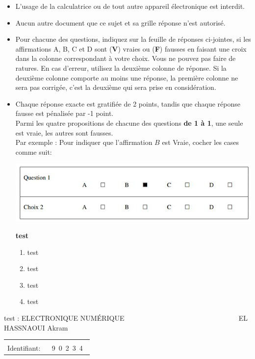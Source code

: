 \documentclass{book}%
\begin{document}
\begin{itemize}%
\item%
L'usage de la calculatrice ou de tout autre appareil électronique est interdit.%
\item%
Aucun autre document que ce sujet et sa grille réponse n'est autorisé.%
\item%
Pour chacune des questions, indiquez sur la feuille de réponses ci-jointes, si les affirmations A, B, C et D sont (\textbf{V}) vraies ou (\textbf{F}) fausses en faisant une croix dans la colonne correspondant à votre choix. Vous ne pouvez pas faire de ratures. En cas d'erreur, utilisez la deuxième colonne de réponse. Si la deuxième colonne comporte au moins une réponse, la première colonne ne sera pas corrigée, c'est la deuxième qui sera prise en considération.%
\item%
Chaque réponse exacte est gratifiée de 2 points, tandis que chaque réponse fausse est pénalisée par -1 point. \\ 	Parmi les quatre propositions de chacune des questions \textbf{de 1 à 1}, une seule est vraie, les autres sont fausses. \\ 	Par exemple : Pour indiquer que l'affirmation $B$ est Vraie, cocher les cases comme suit:  \\ \begin{center}	\includegraphics[scale=0.8]{reponses.png} \end{center}%
\thispagestyle{empty}%
\begin{exercise}%
\textbf{test }%
\begin{enumerate}[label=\textbf{\Alph*. }]%
\item%
test%
\item%
test%
\item%
test%
\item%
test%
\end{enumerate}%
\end{exercise}%
\end{itemize}%
\newpage%
\thispagestyle{empty}%
test : ELECTRONIQUE NUMÉRIQUE $\qquad \qquad \qquad \qquad \qquad \qquad \qquad \qquad$ EL HASSNAOUI Akram%
\begin{flushright}%
\begin{tabular}{|l|}%
\hline%
 \\%
\thispagestyle{empty}%
Identifiant: $\quad$ {\Large 9~0~2~3~4~}%
 \\%
\hline%
\end{tabular}%
\end{flushright}%
\end{document}
